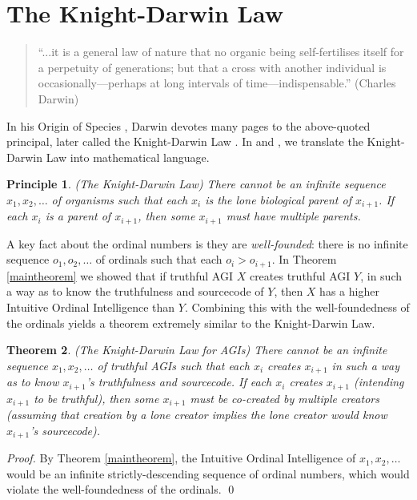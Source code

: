 \documentclass[runningheads]{llncs}
\newtheorem{mytheorem}{Theorem}
\newtheorem{myprinciple}[mytheorem]{Principle}
\begin{document}
\section{The Knight-Darwin Law}
\label{knightdarwinagisection}

\begin{quote}
``...it is a general law of nature that no organic being self-fertilises itself
for a perpetuity of generations; but that a cross with another individual
is occasionally---perhaps at long intervals of time---indispensable.''
(Charles Darwin)
\end{quote}

In his Origin of Species \cite{originofspecies}, Darwin devotes many
pages to the above-quoted principal, later called the
Knight-Darwin Law \cite{darwin1898knight}. In \cite{alexander2013} and
\cite{alexander2015alternative}, we translate
the Knight-Darwin Law into mathematical language.

\begin{myprinciple}
(The Knight-Darwin Law)
There cannot be an infinite sequence
$x_1,x_2,\ldots$ of organisms such that each $x_i$
is the lone biological parent of $x_{i+1}$.
If each $x_i$ is a parent of $x_{i+1}$, then some $x_{i+1}$
must have multiple parents.
\end{myprinciple}

A key fact about the ordinal numbers is they are
\emph{well-founded}: there is
no infinite sequence $o_1,o_2,\ldots$ of ordinals such that each
$o_i>o_{i+1}$. In Theorem \ref{maintheorem} we showed that if truthful
AGI $X$ creates truthful AGI $Y$, in such a way as to know the truthfulness
and sourcecode of $Y$, then $X$ has a higher Intuitive Ordinal Intelligence
than $Y$. Combining this with the well-foundedness of the ordinals yields
a theorem extremely similar to the Knight-Darwin Law.

\begin{mytheorem}
\label{maintheorem2}
(The Knight-Darwin Law for AGIs)
There cannot be an infinite sequence
$x_1,x_2,\ldots$ of truthful AGIs such that each $x_i$
creates $x_{i+1}$ in such a way as to know $x_{i+1}$'s truthfulness and sourcecode.
If each $x_i$ creates $x_{i+1}$ (intending $x_{i+1}$ to be truthful), then
some $x_{i+1}$ must be co-created by multiple creators (assuming that creation by
a lone creator implies the lone creator would know $x_{i+1}$'s sourcecode).
\end{mytheorem}

\begin{proof}
By Theorem \ref{maintheorem}, the Intuitive Ordinal Intelligence of $x_1,x_2,\ldots$
would be an infinite strictly-descending sequence of ordinal numbers, which would
violate the well-foundedness of the ordinals.
\qed
\end{proof}
\end{document}
